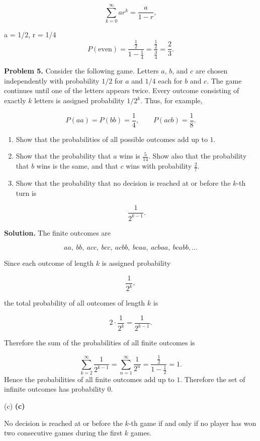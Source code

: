 \documentclass[12pt]{article}
\begin{document}
\[
\sum_{k=0}^{\infty} ar^k
=
\frac{a}{1-r},
\]

a = 1/2, r = 1/4
\[
P(\text{even})
=
\frac{\frac12}{1-\frac14}
=
\frac{\frac12}{\frac34}
=
\frac23.
\]

\textbf{Problem 5.} Consider the following game. Letters \(a\), \(b\), and \(c\) are chosen independently with probability \(1/2\) for \(a\) and \(1/4\) each for \(b\) and \(c\). The game continues until one of the letters appears twice. Every outcome consisting of exactly \(k\) letters is assigned probability \(1/2^k\). Thus, for example,

\[
P(aa)=P(bb)=\frac14,
\qquad
P(acb)=\frac18.
\]

\begin{enumerate}[label=(\alph*)]
    \item Show that the probabilities of all possible outcomes add up to \(1\).

    \item Show that the probability that \(a\) wins is \(\frac{5}{14}\). Show also that the probability that \(b\) wins is the same, and that \(c\) wins with probability \(\frac{2}{7}\).

    \item Show that the probability that no decision is reached at or before the \(k\)-th turn is

    \[
    \frac{1}{2^{k-1}}.
    \]
\end{enumerate}

\textbf{Solution.}
The finite outcomes are

\[
aa,\ bb,\ acc,\ bcc,\ acbb,\ bcaa,\ acbaa,\ bcabb,\ldots
\]

Since each outcome of length \(k\) is assigned probability

\[
\frac{1}{2^k},
\]

the total probability of all outcomes of length \(k\) is

\[
2\cdot\frac{1}{2^k}
=
\frac{1}{2^{k-1}}.
\]

Therefore the sum of the probabilities of all finite outcomes is

\[
\sum_{k=2}^{\infty}\frac{1}{2^{k-1}}
=
\sum_{n=1}^{\infty}\frac{1}{2^n}
=
\frac{\frac12}{1-\frac12}
=
1.
\]
Hence the probabilities of all finite outcomes add up to \(1\). Therefore the set of infinite outcomes has probability \(0\).

(c)
\textbf{(c)}

No decision is reached at or before the \(k\)-th game if and only if no player has won two consecutive games during the first \(k\) games.
\end{document}
